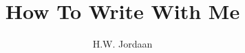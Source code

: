 \documentclass[]{article}
\title{How To Write With Me}
\author{H.W. Jordaan}
\begin{document}
\maketitle

\section{}
\end{document}
